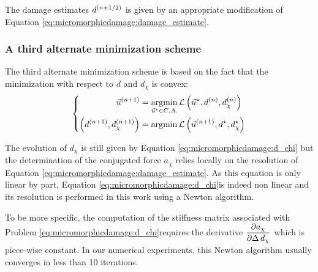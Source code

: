 The damage estimates \(\iter{n+1/2}{d}\) is given by an appropriate
modification of Equation \eqref{eq:micromorphicdamage:damage_estimate}.

\subsubsection{A third alternate minimization scheme}

The third alternate minimization scheme is based on the fact that the
minimization with respect to \(d\) and \(d_{\chi}\) is convex:
\[
\left\{
\begin{aligned}
\iter{n+1}{\vec{u}} &= \underset{\vec{u}^{\star}\in C.A.}{\argmin}\, \mathcal{L}\paren{\vec{u}^{\star},\iter{n}{d},\iter{n}{d_{\chi}}}\\
\paren{\iter{n+1}{d},\iter{n+1}{d_{\chi}}} &= \argmin \,\mathcal{L}\paren{\iter{n+1}{\vec{u}},d^{\star},d_{\chi}^{\star}}
\end{aligned}
\right.
\]

The evolution of \(d_{\chi}\) is still given by Equation
\eqref{eq:micromorphicdamage:d_chi} but the determination of the conjugated
force \(a_{\chi}\) relies locally on the resolution of Equation
\eqref{eq:micromorphicdamage:damage_estimate}.
As this equation is only linear
by part, Equation \eqref{eq:micromorphicdamage:d_chi}is indeed non linear and
its resolution is performed in this work using a Newton algorithm.

To be more specific, the computation of the stiffness matrix associated
with Problem \eqref{eq:micromorphicdamage:d_chi}requires the derivative
\(\deriv{a_{\chi}}{\Delta\,d_{\chi}}\) which is piece-wise constant. In
our numerical experiments, this Newton algorithm usually converges in
less than 10 iterations.
